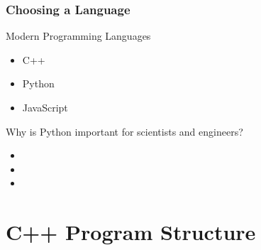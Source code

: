 \documentclass[fleqn]{beamer} %
\newcommand{\sectiontitleII}{Choosing a Language}
\newcommand{\sectiontitleIII}{C++ Program Structure}
\begin{document}
	\begin{frame} \small
		\frametitle{\sectiontitleII}
		
		Modern Programming Languages 
		\begin{itemize}
			\item C++
			\item Python
			\item JavaScript
		\end{itemize}
		
		Why is Python important for scientists and engineers? 
		\begin{itemize}
			\item 
			\item
			\item
		\end{itemize}
	
	\end{frame}	

\section{\sectiontitleIII}

		
		
		
		
		
		


\end{document}
